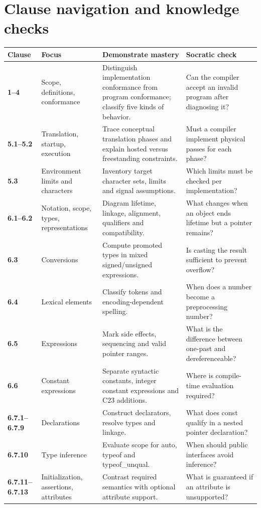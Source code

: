 \documentclass[10pt,letterpaper,oneside]{report}
\begin{document}
\chapter{Clause navigation and knowledge checks}
\small
\begin{longtable}{p{.11\linewidth}p{.19\linewidth}p{.34\linewidth}p{.24\linewidth}}\toprule Clause & Focus & Demonstrate mastery & Socratic check\\\midrule\endhead
\textbf{1--4} & Scope, definitions, conformance & Distinguish implementation conformance from program conformance; classify five kinds of behavior. & Can the compiler accept an invalid program after diagnosing it?\\\hline
\textbf{5.1--5.2} & Translation, startup, execution & Trace conceptual translation phases and explain hosted versus freestanding constraints. & Must a compiler implement physical passes for each phase?\\\hline
\textbf{5.3} & Environment limits and characters & Inventory target character sets, limits and signal assumptions. & Which limits must be checked per implementation?\\\hline
\textbf{6.1--6.2} & Notation, scope, types, representations & Diagram lifetime, linkage, alignment, qualifiers and compatibility. & What changes when an object ends lifetime but a pointer remains?\\\hline
\textbf{6.3} & Conversions & Compute promoted types in mixed signed/unsigned expressions. & Is casting the result sufficient to prevent overflow?\\\hline
\textbf{6.4} & Lexical elements & Classify tokens and encoding-dependent spelling. & When does a number become a preprocessing number?\\\hline
\textbf{6.5} & Expressions & Mark side effects, sequencing and valid pointer ranges. & What is the difference between one-past and dereferenceable?\\\hline
\textbf{6.6} & Constant expressions & Separate syntactic constants, integer constant expressions and C23 additions. & Where is compile-time evaluation required?\\\hline
\textbf{6.7.1--6.7.9} & Declarations & Construct declarators, resolve types and linkage. & What does const qualify in a nested pointer declaration?\\\hline
\textbf{6.7.10} & Type inference & Evaluate scope for auto, typeof and typeof\_unqual. & When should public interfaces avoid inference?\\\hline
\textbf{6.7.11--6.7.13} & Initialization, assertions, attributes & Contrast required semantics with optional attribute support. & What is guaranteed if an attribute is unsupported?\\\hline

\end{longtable}
\end{document}
